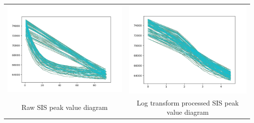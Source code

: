 \documentclass{subfile}
\begin{document}
  \begin{tabular}{cc}
    \includegraphics[scale=0.5]{SISp05chaos} & \includegraphics[scale=0.5]{logTrSISp05}\\
    Raw SIS peak value diagram & Log transform processed SIS peak value diagram\\

\end{tabular}
\end{document}
